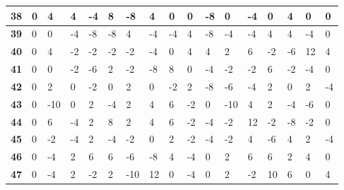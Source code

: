 \begin{longtable}[c]{|l|l|l|l|l|l|l|l|l|l|l|l|l|l|l|l|l|}
\textbf{38} & 0          & 4          & 4          & -4         & 8          & -8         & 4          & 0          & 0          & -8         & 0           & -4          & 0           & 4           & 0           & 0            \\ \hline
\textbf{39} & 0          & 0          & -4         & -8         & -8         & 4          & -4         & -4         & 4          & -8         & -4          & -4          & 4           & 4           & -4          & 0            \\ \hline
\textbf{40} & 0          & 4          & -2         & -2         & -2         & -2         & -4         & 0          & 4          & 4          & 2           & 6           & -2          & -6          & 12          & 4            \\ \hline
\textbf{41} & 0          & 0          & -2         & -6         & 2          & -2         & -8         & 8          & 0          & -4         & -2          & -2          & 6           & -2          & -4          & 0            \\ \hline
\textbf{42} & 0          & 2          & 0          & -2         & 0          & 2          & 0          & -2         & 2          & -8         & -6          & -4          & 2           & 0           & 2           & -4           \\ \hline
\textbf{43} & 0          & -10        & 0          & 2          & -4         & 2          & 4          & 6          & -2         & 0          & -10         & 4           & 2           & -4          & -6          & 0            \\ \hline
\textbf{44} & 0          & 6          & -4         & 2          & 8          & 2          & 4          & 6          & -2         & -4         & -2          & 12          & -2          & -8          & -2          & 0            \\ \hline
\textbf{45} & 0          & -2         & -4         & 2          & -4         & -2         & 0          & 2          & -2         & -4         & -2          & 4           & -6          & 4           & 2           & -4           \\ \hline
\textbf{46} & 0          & -4         & 2          & 6          & 6          & -6         & -8         & 4          & -4         & 0          & 2           & 6           & 6           & 2           & 4           & 0            \\ \hline
\textbf{47} & 0          & -4         & 2          & -2         & 2          & -10        & 12         & 0          & -4         & 0          & 2           & -2          & 10          & 6           & 0           & 4            \\ \hline

\end{longtable}
